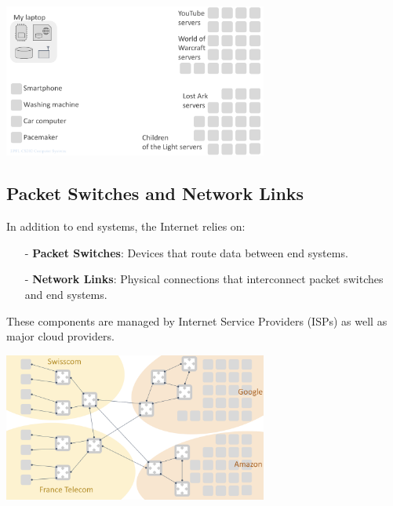 \begin{center}
  \includegraphics[width=0.65\textwidth]{chapters/L1/images/endsys.png}
\end{center}
\vfill
\newpage
\subsection{Packet Switches and Network Links}

In addition to end systems, the Internet relies on:
\begin{itemize}
  \item[-] \textbf{Packet Switches}: Devices that route data between end systems.
  \item[-] \textbf{Network Links}: Physical connections that interconnect packet switches and end systems.
\end{itemize}

These components are managed by Internet Service Providers (ISPs) as well as major cloud providers.

\begin{center}
  \includegraphics[width=0.65\textwidth]{chapters/L1/images/internet_schema.png}
\end{center}

